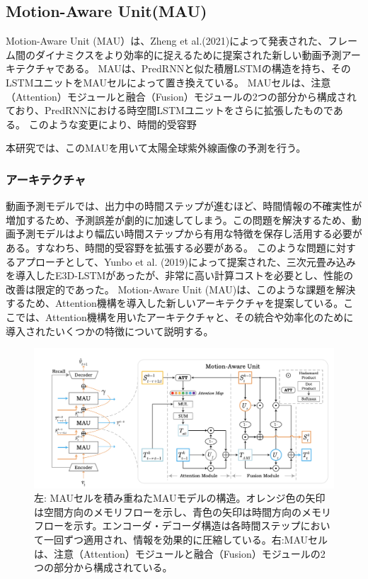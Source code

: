     \subsection{Motion-Aware Unit(MAU)}
      Motion-Aware Unit (MAU）は、Zheng et al.(2021)によって発表された、フレーム間のダイナミクスをより効率的に捉えるために提案された新しい動画予測アーキテクチャである。
      MAUは、PredRNNと似た積層LSTMの構造を持ち、そのLSTMユニットをMAUセルによって置き換えている。
      MAUセルは、注意（Attention）モジュールと融合（Fusion）モジュールの2つの部分から構成されており、PredRNNにおける時空間LSTMユニットをさらに拡張したものである。
      このような変更により、時間的受容野

      本研究では、このMAUを用いて太陽全球紫外線画像の予測を行う。
      
      \subsubsection{アーキテクチャ}
      動画予測モデルでは、出力中の時間ステップが進むほど、時間情報の不確実性が増加するため、予測誤差が劇的に加速してしまう。この問題を解決するため、動画予測モデルはより幅広い時間ステップから有用な特徴を保存し活用する必要がある。すなわち、時間的受容野を拡張する必要がある。
      このような問題に対するアプローチとして、Yunbo et al. (2019)によって提案された、三次元畳み込みを導入したE3D-LSTMがあったが、非常に高い計算コストを必要とし、性能の改善は限定的であった。
      Motion-Aware Unit (MAU)は、このような課題を解決するため、Attention機構を導入した新しいアーキテクチャを提案している。ここでは、Attention機構を用いたアーキテクチャと、その統合や効率化のために導入されたいくつかの特徴について説明する。
      
      \begin{figure}[htbp]
        \begin{center}
          \includegraphics[width=160mm]{figures/mau.png}
          \caption{左: MAUセルを積み重ねたMAUモデルの構造。オレンジ色の矢印は空間方向のメモリフローを示し、青色の矢印は時間方向のメモリフローを示す。エンコーダ・デコーダ構造は各時間ステップにおいて一回ずつ適用され、情報を効果的に圧縮している。右:MAUセルは、注意（Attention）モジュールと融合（Fusion）モジュールの2つの部分から構成されている。}
          \label{fig:mau_attention}
        \end{center}
      \end{figure}
        
